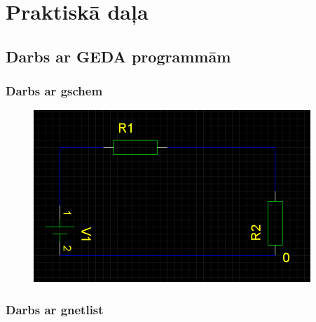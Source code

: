 \documentclass{report}
\begin{document}
\chapter{Praktiskā daļa}
\section{Darbs ar GEDA programmām}
\subsection{Darbs ar gschem}
\begin{figure}[h]
    \centering
    \includegraphics{gschem01.png}
    \caption{}
    \label{fig:sh2}
\end{figure}

\newpage
\subsection{Darbs ar gnetlist}

\end{document}
